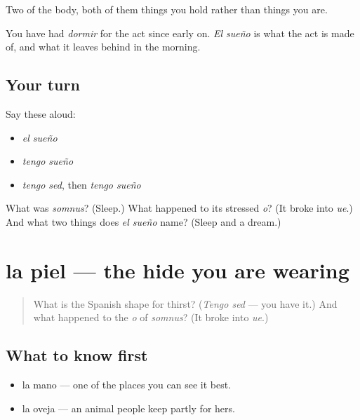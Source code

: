 \begin{grammarlens}[title={What you've built}]
Two of the body, both of them things you hold rather than things you are.

You have had \emph{dormir} for the act since early on. \emph{El sueño} is what the act is made of, and what it leaves behind in the morning.
\end{grammarlens}

\subsection*{Your turn}
Say these aloud:

\begin{itemize}
\raggedright
  \item \emph{el sueño}
  \item \emph{tengo sueño}
  \item \emph{tengo sed}, then \emph{tengo sueño}
\end{itemize}

\begin{tcolorbox}[breakable,colback=teal!4,colframe=teal!35!black,title={Before you move on}]
What was \emph{somnus}? (Sleep.) What happened to its stressed \emph{o}? (It broke into \emph{ue}.) And what two things does \emph{el sueño} name? (Sleep and a dream.)
\end{tcolorbox}
\section[la piel]{la piel — the hide you are wearing}

\label{lesson:ES-C300-piel}



\begin{quote}
What is the Spanish shape for thirst? (\emph{Tengo sed} — you have it.) And what happened to the \emph{o} of \emph{somnus}? (It broke into \emph{ue}.)
\end{quote}

\subsection*{What to know first}
\begin{itemize}
\raggedright
  \item la mano — one of the places you can see it best.
  \item la oveja — an animal people keep partly for hers.
\end{itemize}

